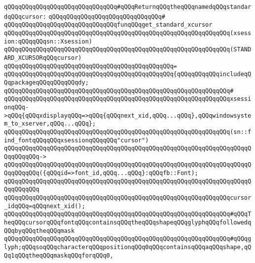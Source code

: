 \newline
\verb|qQQqqQQqqQQqqQQqqQQqqQQqqQQqqQQq#qQQqReturnqQQqtheqQQqnamedqQQqstandardqQQqcursor:|\newline
\verb|qQQqqQQqqQQqqQQqqQQqqQQqqQQqqQQq#|\newline
\verb|qQQqqQQqqQQqqQQqqQQqqQQqqQQqqQQqfunqQQqget_standard_xcursor|\newline
\verb|qQQqqQQqqQQqqQQqqQQqqQQqqQQqqQQqqQQqqQQqqQQqqQQqqQQqqQQqqQQqqQQq(xsession:qQQqqQQqsn::Xsession)|\newline
\verb|qQQqqQQqqQQqqQQqqQQqqQQqqQQqqQQqqQQqqQQqqQQqqQQqqQQqqQQqqQQqqQQq(STANDARD_XCURSORqQQqcursor)|\newline
\verb|qQQqqQQqqQQqqQQqqQQqqQQqqQQqqQQqqQQqqQQqqQQqqQQq=|\newline
\verb|qQQqqQQqqQQqqQQqqQQqqQQqqQQqqQQqqQQqqQQqqQQqqQQq{qQQqqQQqqQQqincludeqQQqpackageqQQqqQQqqQQqdy;|\newline
\verb|qQQqqQQqqQQqqQQqqQQqqQQqqQQqqQQqqQQqqQQqqQQqqQQqqQQqqQQqqQQqqQQq#|\newline
\verb|qQQqqQQqqQQqqQQqqQQqqQQqqQQqqQQqqQQqqQQqqQQqqQQqqQQqqQQqqQQqqQQqxsessionqQQq->qQQq{qQQqxdisplayqQQq=>qQQq{qQQqnext_xid,qQQq...qQQq},qQQqwindowsystem_to_xserver,qQQq...qQQq};|\newline
\newline
\verb|qQQqqQQqqQQqqQQqqQQqqQQqqQQqqQQqqQQqqQQqqQQqqQQqqQQqqQQqqQQqqQQq(sn::find_fontqQQqqQQqxsessionqQQqqQQq"cursor")|\newline
\verb|qQQqqQQqqQQqqQQqqQQqqQQqqQQqqQQqqQQqqQQqqQQqqQQqqQQqqQQqqQQqqQQqqQQqqQQqqQQqqQQq->|\newline
\verb|qQQqqQQqqQQqqQQqqQQqqQQqqQQqqQQqqQQqqQQqqQQqqQQqqQQqqQQqqQQqqQQqqQQqqQQqqQQqqQQq({qQQqid=>font_id,qQQq...qQQq}:qQQqfb::Font);|\newline
\verb|qQQqqQQqqQQqqQQqqQQqqQQqqQQqqQQqqQQqqQQqqQQqqQQqqQQqqQQqqQQqqQQqqQQqqQQqqQQqqQQq|\newline
\newline
\verb|qQQqqQQqqQQqqQQqqQQqqQQqqQQqqQQqqQQqqQQqqQQqqQQqqQQqqQQqqQQqqQQqcursor_idqQQq=qQQqnext_xid();|\newline
\newline
\verb|qQQqqQQqqQQqqQQqqQQqqQQqqQQqqQQqqQQqqQQqqQQqqQQqqQQqqQQqqQQqqQQq#qQQqTheqQQqcursorqQQqfontqQQqcontainsqQQqtheqQQqshapeqQQqglyphqQQqfollowedqQQqbyqQQqtheqQQqmask|\newline
\verb|qQQqqQQqqQQqqQQqqQQqqQQqqQQqqQQqqQQqqQQqqQQqqQQqqQQqqQQqqQQqqQQq#qQQqglyph;qQQqsoqQQqcharacterqQQqpositionqQQq0qQQqcontainsqQQqaqQQqshape,qQQq1qQQqtheqQQqmaskqQQqforqQQq0,|\newline
